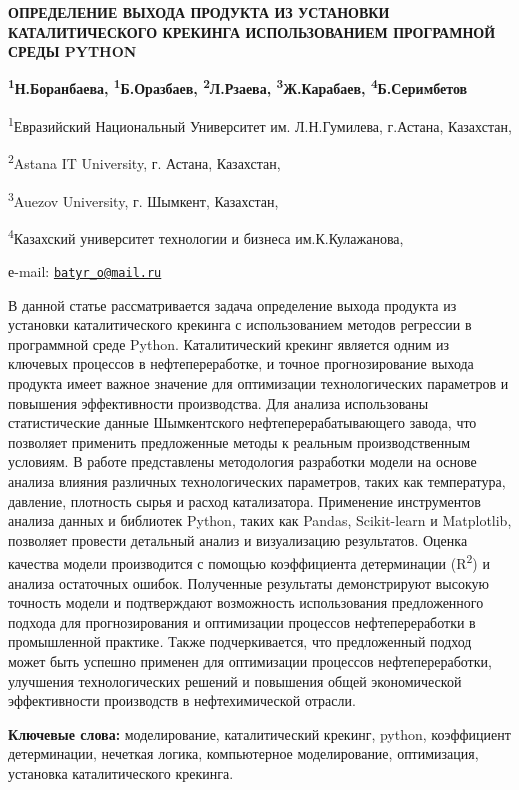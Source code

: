 {\bfseries ОПРЕДЕЛЕНИЕ ВЫХОДА ПРОДУКТА ИЗ УСТАНОВКИ КАТАЛИТИЧЕСКОГО
КРЕКИНГА ИСПОЛЬЗОВАНИЕМ ПРОГРАМНОЙ СРЕДЫ PYTHON}

{\bfseries \textsuperscript{1}Н.Боранбаева,
\textsuperscript{1}Б.Оразбаев\textsuperscript{\envelope },
\textsuperscript{2}Л.Рзаева, \textsuperscript{3}Ж.Карабаев,
\textsuperscript{4}Б.Серимбетов}

\textsuperscript{1}Евразийский Национальный Университет им.
Л.Н.Гумилева, г.Астана, Казахстан,

\textsuperscript{2}Astana IT University, г. Астана, Казахстан,

\textsuperscript{3}Auezov University, г. Шымкент, Казахстан,

\textsuperscript{4}Казахский университет технологии и бизнеса
им.К.Кулажанова,

е-mail: \href{mailto:batyr_o@mail.ru}{\nolinkurl{batyr\_o@mail.ru}}

В данной статье рассматривается задача определение выхода продукта из
установки каталитического крекинга с использованием методов регрессии в
программной среде Python. Каталитический крекинг является одним из
ключевых процессов в нефтепереработке, и точное прогнозирование выхода
продукта имеет важное значение для оптимизации технологических
параметров и повышения эффективности производства. Для анализа
использованы статистические данные Шымкентского нефтеперерабатывающего
завода, что позволяет применить предложенные методы к реальным
производственным условиям. В работе представлены методология разработки
модели на основе анализа влияния различных технологических параметров,
таких как температура, давление, плотность сырья и расход катализатора.
Применение инструментов анализа данных и библиотек Python, таких как
Pandas, Scikit-learn и Matplotlib, позволяет провести детальный анализ и
визуализацию результатов. Оценка качества модели производится с помощью
коэффициента детерминации (R\textsuperscript{2}) и анализа остаточных
ошибок. Полученные результаты демонстрируют высокую точность модели и
подтверждают возможность использования предложенного подхода для
прогнозирования и оптимизации процессов нефтепереработки в промышленной
практике\emph{.} Также подчеркивается, что предложенный подход может
быть успешно применен для оптимизации процессов нефтепереработки,
улучшения технологических решений и повышения общей экономической
эффективности производств в нефтехимической отрасли.

{\bfseries Ключевые слова:} моделирование, каталитический крекинг, python,
коэффициент детерминации, нечеткая логика, компьютерное моделирование,
оптимизация, установка каталитического крекинга.


